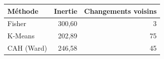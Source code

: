 \begin{tabular}{lrr}
\toprule
Méthode & Inertie & Changements voisins \\
\midrule
Fisher & 300{,}60 & 3 \\
K-Means & 202{,}89 & 75 \\
CAH (Ward) & 246{,}58 & 45 \\
\bottomrule
\end{tabular}
